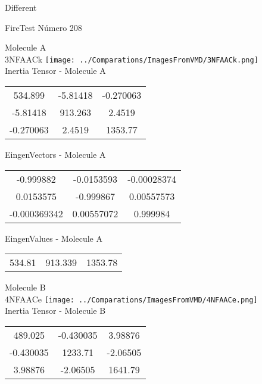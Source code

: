 \begin{center}
\vtab
\vtab
\textcolor{NavyBlue}{\Large Different}
\end{center}

 \newpage

\vtab[-2cm]
\begin{center}
{\large FireTest \tab Número 208}
\end{center}
\begin{multicols}{2}
\begin{center}

Molecule A \\ 
3NFAACk
\texttt{[image: ../Comparations/ImagesFromVMD/3NFAACk.png]}
\\
Inertia Tensor - Molecule A \\
\vtab

\begin{tabular}{|c c c|}
534.899	 & 	-5.81418	 & 	-0.270063	 \\
-5.81418	 & 	913.263	 & 	2.4519	 \\
-0.270063	 & 	2.4519	 & 	1353.77
\end{tabular}

\vtab
 EingenVectors - Molecule A     \\
\vtab
\begin{tabular}{|c c c|}
-0.999882	 & 	-0.0153593	 & 	-0.00028374	 \\
0.0153575	 & 	-0.999867	 & 	0.00557573	 \\
-0.000369342	 & 	0.00557072	 & 	0.999984
\end{tabular}

\vtab
 EingenValues - Molecule A     \\
\vtab
\begin{tabular}{|c c c|}
534.81	 & 	913.339	 & 	1353.78	 \\
\end{tabular}
\columnbreak

Molecule B \\ 
4NFAACe
\texttt{[image: ../Comparations/ImagesFromVMD/4NFAACe.png]}
\\
Inertia Tensor - Molecule B \\
\vtab

\begin{tabular}{|c c c|}
489.025	 & 	-0.430035	 & 	3.98876	 \\
-0.430035	 & 	1233.71	 & 	-2.06505	 \\
3.98876	 & 	-2.06505	 & 	1641.79
\end{tabular}


\end{center}
\end{multicols}

